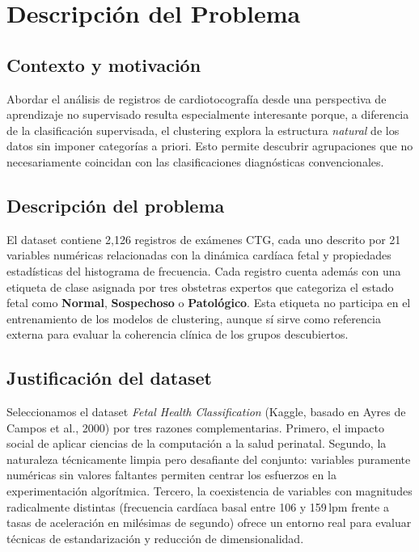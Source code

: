 \documentclass[12pt,letterpaper]{article}
\begin{document}
\section{Descripción del Problema}

\subsection{Contexto y motivación}

Abordar el análisis de registros de cardiotocografía desde una perspectiva de aprendizaje
no supervisado resulta especialmente interesante porque, a diferencia de la clasificación
supervisada, el clustering explora la estructura \textit{natural} de los datos sin imponer
categorías a priori. Esto permite descubrir agrupaciones que no necesariamente coincidan
con las clasificaciones diagnósticas convencionales.

\subsection{Descripción del problema}

El dataset contiene 2{,}126 registros de exámenes CTG, cada uno descrito por 21 variables
numéricas relacionadas con la dinámica cardíaca fetal y propiedades estadísticas del
histograma de frecuencia. Cada registro cuenta además con una etiqueta de clase asignada
por tres obstetras expertos que categoriza el estado fetal como \textbf{Normal},
\textbf{Sospechoso} o \textbf{Patológico}. Esta etiqueta no participa en el entrenamiento
de los modelos de clustering, aunque sí sirve como referencia externa para evaluar la
coherencia clínica de los grupos descubiertos.

\subsection{Justificación del dataset}

Seleccionamos el dataset \textit{Fetal Health Classification} (Kaggle, basado en Ayres de
Campos et al., 2000) por tres razones complementarias. Primero, el impacto social de
aplicar ciencias de la computación a la salud perinatal. Segundo, la naturaleza técnicamente
limpia pero desafiante del conjunto: variables puramente numéricas sin valores faltantes
permiten centrar los esfuerzos en la experimentación algorítmica. Tercero, la coexistencia
de variables con magnitudes radicalmente distintas (frecuencia cardíaca basal entre 106 y
159\,lpm frente a tasas de aceleración en milésimas de segundo) ofrece un entorno real
para evaluar técnicas de estandarización y reducción de dimensionalidad.
\end{document}
